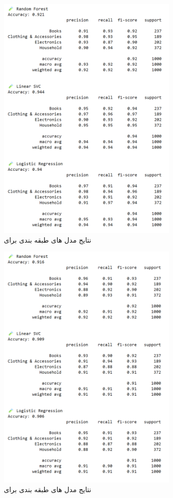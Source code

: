 \documentclass[a4paper,12pt]{article}
\begin{document}
\begin{figure}[H]
    \centering
    \includegraphics[width=0.8\textwidth]{tfidfModel.png}
    \caption*{ نتایج مدل های طبقه بندی برای }
    \label{fig:yourlabel}
\end{figure}

\begin{figure}[H]
    \centering
    \includegraphics[width=0.8\textwidth]{word2vecModel.png}
    \caption*{ نتایج مدل های طبقه بندی برای }
    \label{fig:yourlabel}
\end{figure}
\vspace{0.5cm}
\end{document}
